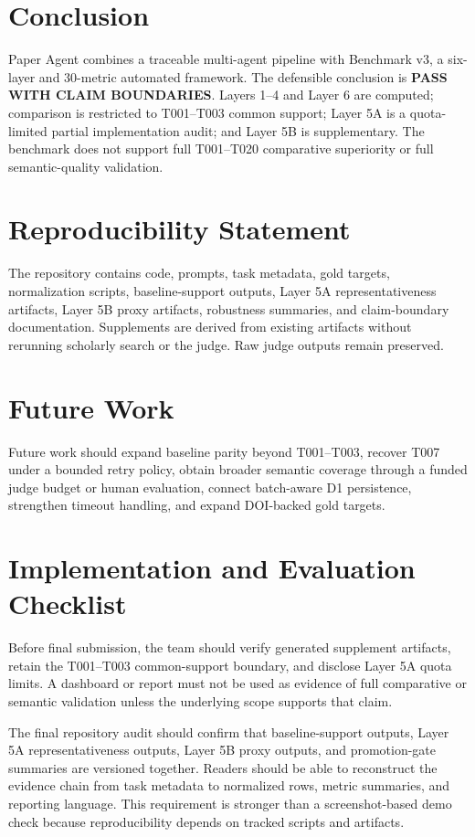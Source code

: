 \documentclass[10pt,twocolumn]{article}
\begin{document}
\section{Conclusion}
Paper Agent combines a traceable multi-agent pipeline with Benchmark v3, a six-layer and 30-metric automated framework. The defensible conclusion is \textbf{PASS WITH CLAIM BOUNDARIES}. Layers 1--4 and Layer 6 are computed; comparison is restricted to T001--T003 common support; Layer 5A is a quota-limited partial implementation audit; and Layer 5B is supplementary. The benchmark does not support full T001--T020 comparative superiority or full semantic-quality validation.

\section{Reproducibility Statement}
The repository contains code, prompts, task metadata, gold targets, normalization scripts, baseline-support outputs, Layer 5A representativeness artifacts, Layer 5B proxy artifacts, robustness summaries, and claim-boundary documentation. Supplements are derived from existing artifacts without rerunning scholarly search or the judge. Raw judge outputs remain preserved.

\section{Future Work}
Future work should expand baseline parity beyond T001--T003, recover T007 under a bounded retry policy, obtain broader semantic coverage through a funded judge budget or human evaluation, connect batch-aware D1 persistence, strengthen timeout handling, and expand DOI-backed gold targets.

\section{Implementation and Evaluation Checklist}
Before final submission, the team should verify generated supplement artifacts, retain the T001--T003 common-support boundary, and disclose Layer 5A quota limits. A dashboard or report must not be used as evidence of full comparative or semantic validation unless the underlying scope supports that claim.


The final repository audit should confirm that baseline-support outputs, Layer 5A representativeness outputs, Layer 5B proxy outputs, and promotion-gate summaries are versioned together. Readers should be able to reconstruct the evidence chain from task metadata to normalized rows, metric summaries, and reporting language. This requirement is stronger than a screenshot-based demo check because reproducibility depends on tracked scripts and artifacts.
\end{document}
